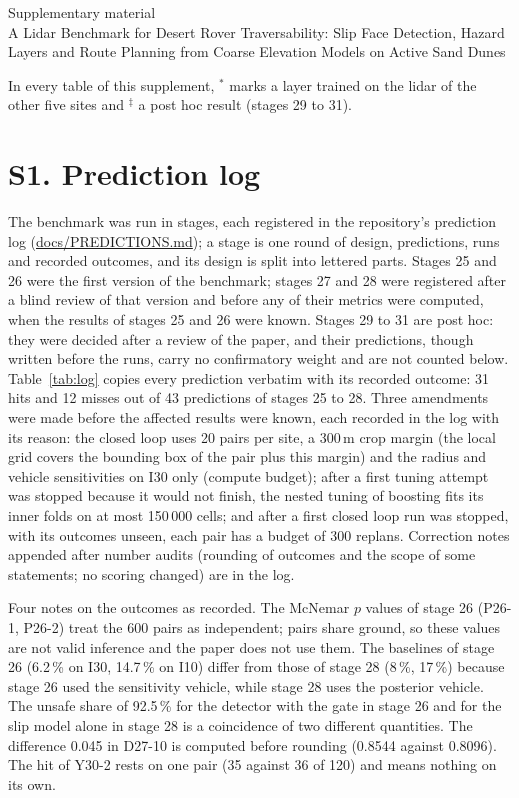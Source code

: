 \documentclass[10pt]{article}
\begin{document}
\begin{center}
{\large Supplementary material}\\[2pt]
{\normalsize A Lidar Benchmark for Desert Rover Traversability: Slip Face Detection, Hazard Layers and Route Planning from Coarse Elevation Models on Active Sand Dunes}
\end{center}
\noindent In every table of this supplement, $^{*}$ marks a layer trained on the lidar of the other five sites and $^{\ddagger}$ a post hoc result (stages 29 to 31).

\section*{S1. Prediction log}
The benchmark was run in stages, each registered in the repository's prediction log (\url{docs/PREDICTIONS.md}); a stage is one round of design, predictions, runs and recorded outcomes, and its design is split into lettered parts. Stages 25 and 26 were the first version of the benchmark; stages 27 and 28 were registered after a blind review of that version and before any of their metrics were computed, when the results of stages 25 and 26 were known. Stages 29 to 31 are post hoc: they were decided after a review of the paper, and their predictions, though written before the runs, carry no confirmatory weight and are not counted below. Table~\ref{tab:log} copies every prediction verbatim with its recorded outcome: 31 hits and 12 misses out of 43 predictions of stages 25 to 28. Three amendments were made before the affected results were known, each recorded in the log with its reason: the closed loop uses 20 pairs per site, a 300\,m crop margin (the local grid covers the bounding box of the pair plus this margin) and the radius and vehicle sensitivities on I30 only (compute budget); after a first tuning attempt was stopped because it would not finish, the nested tuning of boosting fits its inner folds on at most 150\,000 cells; and after a first closed loop run was stopped, with its outcomes unseen, each pair has a budget of 300 replans. Correction notes appended after number audits (rounding of outcomes and the scope of some statements; no scoring changed) are in the log.

Four notes on the outcomes as recorded. The McNemar $p$ values of stage 26 (P26-1, P26-2) treat the 600 pairs as independent; pairs share ground, so these values are not valid inference and the paper does not use them. The baselines of stage 26 (6.2\,\% on I30, 14.7\,\% on I10) differ from those of stage 28 (8\,\%, 17\,\%) because stage 26 used the sensitivity vehicle, while stage 28 uses the posterior vehicle. The unsafe share of 92.5\,\% for the detector with the gate in stage 26 and for the slip model alone in stage 28 is a coincidence of two different quantities. The difference 0.045 in D27-10 is computed before rounding (0.8544 against 0.8096). The hit of Y30-2 rests on one pair (35 against 36 of 120) and means nothing on its own.
\end{document}
